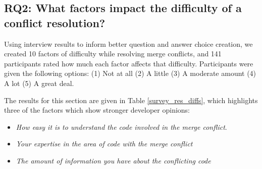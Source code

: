 \subsection{\textbf{RQ2:} What factors impact the difficulty of a conflict resolution?}\label{RQ2}


Using interview results to inform better question and answer choice creation, we created 10 factors of difficulty while resolving merge conflicts, and 141 participants rated how much each factor affects that difficulty. Participants were given the following options:
(1) Not at all (2) A little (3) A moderate amount (4) A lot (5) A great deal.

The results for this section are given in Table \ref{survey_res_diffs}, which highlights three of the factors which show stronger developer opinions:
\begin{itemize}
\item \textit{How easy it is to understand the code involved in the merge conflict}. 
\item \textit{Your expertise in the area of code with the merge conflict}
\item \textit{The amount of information you have about the conflicting code} 
\end{itemize} 

